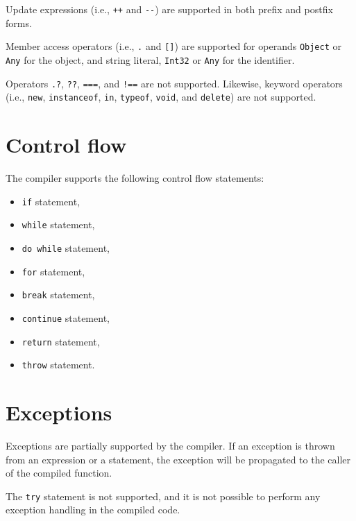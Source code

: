Update expressions (i.e., \texttt{++} and \texttt{{-}{-}}) are supported in both prefix and postfix forms.

Member access operators (i.e., \texttt{.} and \texttt{[]}) are supported for operands \texttt{Object} or \texttt{Any} for the object, and string literal, \texttt{Int32} or \texttt{Any} for the identifier.

Operators \texttt{.?}, \texttt{??}, \texttt{===}, and \texttt{!==} are not supported. Likewise, keyword operators (i.e., \texttt{new}, \texttt{instanceof}, \texttt{in}, \texttt{typeof}, \texttt{void}, and \texttt{delete}) are not supported.


\section{Control flow}

The compiler supports the following control flow statements:
\begin{itemize}
    \item \texttt{if} statement,
    \item \texttt{while} statement,
    \item \texttt{do while} statement,
    \item \texttt{for} statement,
    \item \texttt{break} statement,
    \item \texttt{continue} statement,
    \item \texttt{return} statement,
    \item \texttt{throw} statement.
\end{itemize}


\section{Exceptions}

Exceptions are partially supported by the compiler. If an exception is thrown from an expression or a statement, the exception will be propagated to the caller of the compiled function.

The \texttt{try} statement is not supported, and it is not possible to perform any exception handling in the compiled code.






